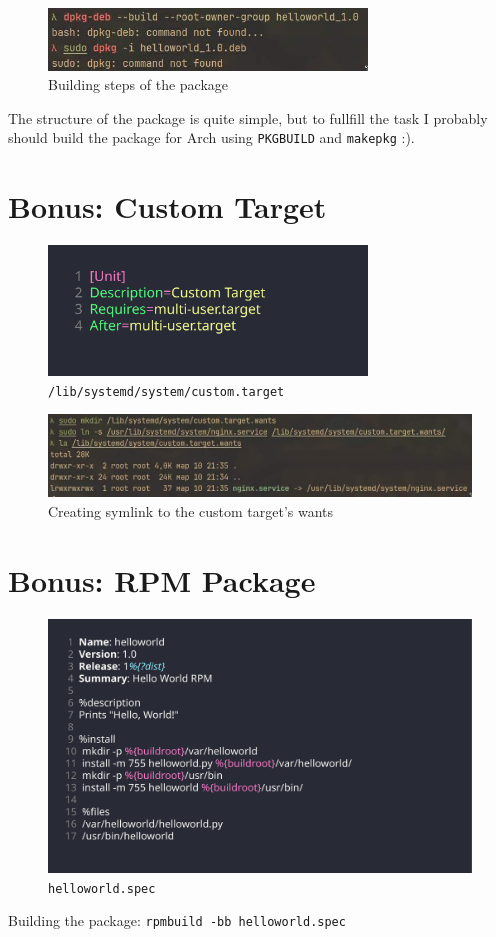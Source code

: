 \documentclass{article}
\newcommand{\code}[1]{\colorbox{light-gray}{\texttt{#1}}}
\begin{document}
\begin{figure}[H]
  \centering
  \includegraphics[width=240pt]{8_1.jpg}
  \caption{Building steps of the package}
\end{figure}

The structure of the package is quite simple, but to fullfill the task I probably should build the package for Arch using \code{PKGBUILD} and \code{makepkg} :).

\section{Bonus: Custom Target}
\noindent

\begin{figure}[H]
  \centering
  \includegraphics[width=240pt]{9_1.png}
  \caption{\code{/lib/systemd/system/custom.target}}
\end{figure}

\begin{figure}[H]
  \centering
  \includegraphics[width=460pt]{9_2.jpg}
  \caption{Creating symlink to the custom target's wants}
\end{figure}

\section{Bonus: RPM Package}

\begin{figure}[H]
  \centering
  \includegraphics[width=320pt]{10_1.png}
  \caption{\code{helloworld.spec}}
\end{figure}

Building the package: \code{rpmbuild -bb helloworld.spec}
\end{document}
